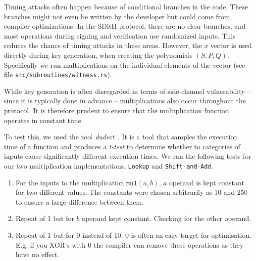 \documentclass[11pt]{report}
\theoremstyle{definition}
\theoremstyle{plain}
\begin{document}
Timing attacks often happen because of conditional branches in the code. These branches might not even be written by the developer but could come from compiler optimizations. In the SDitH protocol, there are no clear branches, and most operations during signing and verification use randomized inputs. This reduces the chance of timing attacks in these areas. However, the $x$ vector is used directly during key generation, when creating the polynomials $(S, P, Q)$. Specifically we run multiplications on the individual elements of the vector (see file \texttt{src/subroutines/witness.rs}).

While key generation is often disregarded in terms of side-channel vulnerability -- since it is typically done in advance -- multiplications also occur throughout the protocol. It is therefore prudent to ensure that the multiplication function operates in constant time.

To test this, we used the tool \textit{dudect}~\cite{reparaz2017dude}. It is a tool that samples the execution time of a function and produces a \textit{t-test} to determine whether to categories of inputs cause significantly different execution times. We ran the following tests for our two multiplication implementations, \texttt{Lookup} and \texttt{Shift-and-Add}.

\begin{enumerate}
  \item For the inputs to the multiplication $\texttt{mul}(a,b)$, $a$ operand is kept constant for two different values. The constants were chosen arbitrarily as $10$ and $250$ to ensure a large difference between them.\label{dudect_test_1}
  \item Repeat of 1 but for $b$ operand kept constant. Checking for the other operand.\label{dudect_test_2}
  \item Repeat of 1 but for $0$ instead of $10$. $0$ is often an easy target for optimisation. E.g. if you XOR's with $0$ the compiler can remove these operations as they have no effect.\label{dudect_test_3}
\end{enumerate}
\end{document}
